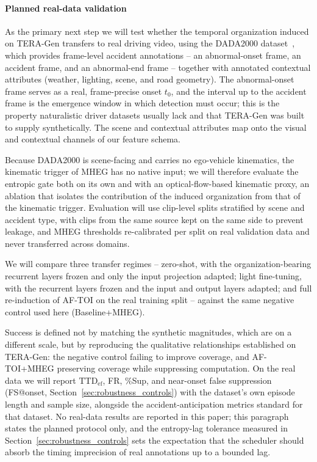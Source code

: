 \documentclass[a4paper,fleqn]{cas-dc}
\newcommand{\TERAGen}{\mbox{TERA-Gen}\xspace}
\newcommand{\AFTOI}{\mbox{AF-TOI}\xspace}
\newcommand{\MHEG}{\mbox{MHEG}\xspace}
\begin{document}
\paragraph{Planned real-data validation}
As the primary next step we will test whether the temporal organization induced
on \TERAGen transfers to real driving video, using the
DADA2000 dataset~\cite{fang2022dada}, which provides frame-level accident
annotations -- an abnormal-onset frame, an accident frame, and an abnormal-end
frame -- together with annotated contextual attributes (weather, lighting, scene,
and road geometry). The abnormal-onset frame serves as a real, frame-precise
onset $t_0$, and the interval up to the accident frame is the emergence window in
which detection must occur; this is the property naturalistic driver datasets
usually lack and that \TERAGen was built to supply synthetically. The scene and
contextual attributes map onto the visual and contextual channels of our feature
schema.

Because DADA2000 is scene-facing and carries no ego-vehicle kinematics,
the kinematic trigger of \MHEG has no native input; we will therefore evaluate the
entropic gate both on its own and with an optical-flow-based kinematic proxy, an
ablation that isolates the contribution of the induced organization from that of
the kinematic trigger. Evaluation will use clip-level splits stratified by scene and
accident type, with clips from the same source kept on the same side to prevent
leakage, and \MHEG thresholds re-calibrated per split on real validation data and
never transferred across domains.

We will compare three transfer regimes --
zero-shot, with the organization-bearing recurrent layers frozen and only the
input projection adapted; light fine-tuning, with the recurrent layers frozen and
the input and output layers adapted; and full re-induction of \AFTOI on the real
training split -- against the same negative control used here (Baseline+MHEG).

Success is defined not by matching the synthetic magnitudes, which are on a
different scale, but by reproducing the qualitative relationships established on
\TERAGen: the negative control failing to improve coverage, and \mbox{AF-TOI}+MHEG
preserving coverage while suppressing computation. On the real data we will report
$\mathrm{TTD}_{\mathrm{ef}}$, FR, \%Sup, and near-onset false suppression
(FS@onset, Section~\ref{sec:robustness_controls}) with the dataset's own episode
length and sample size, alongside the accident-anticipation metrics standard for
that dataset. No real-data results are reported in this paper; this paragraph
states the planned protocol only, and the entropy-lag tolerance measured in
Section~\ref{sec:robustness_controls} sets the expectation that the scheduler
should absorb the timing imprecision of real annotations up to a bounded lag.
\end{document}
